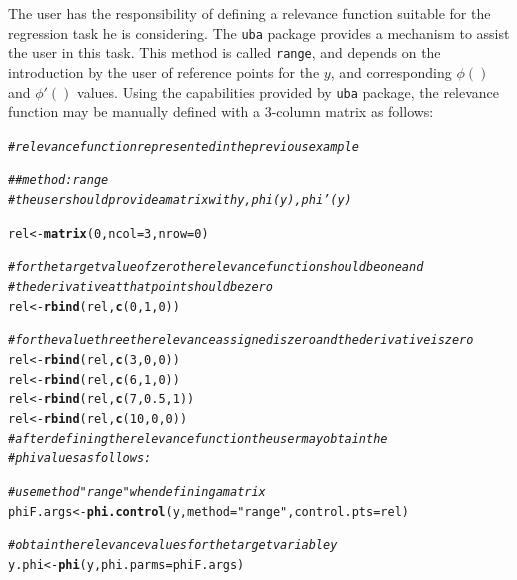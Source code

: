 \documentclass[10pt,a4paper]{article}\usepackage[]{graphicx}\usepackage[]{color}
\makeatletter
\newcommand{\hlnum}[1]{\textcolor[rgb]{0.686,0.059,0.569}{#1}}%
\newcommand{\hlstr}[1]{\textcolor[rgb]{0.192,0.494,0.8}{#1}}%
\newcommand{\hlcom}[1]{\textcolor[rgb]{0.678,0.584,0.686}{\textit{#1}}}%
\newcommand{\hlstd}[1]{\textcolor[rgb]{0.345,0.345,0.345}{#1}}%
\newcommand{\hlkwb}[1]{\textcolor[rgb]{0.69,0.353,0.396}{#1}}%
\newcommand{\hlkwc}[1]{\textcolor[rgb]{0.333,0.667,0.333}{#1}}%
\newcommand{\hlkwd}[1]{\textcolor[rgb]{0.737,0.353,0.396}{\textbf{#1}}}%
\newenvironment{kframe}{%
 \def\at@end@of@kframe{}%
 \ifinner\ifhmode%
  \def\at@end@of@kframe{\end{minipage}}%
  \begin{minipage}{\columnwidth}%
 \fi\fi%
 \def\FrameCommand##1{\hskip\@totalleftmargin \hskip-\fboxsep
 \colorbox{shadecolor}{##1}\hskip-\fboxsep
     \hskip-\linewidth \hskip-\@totalleftmargin \hskip\columnwidth}%
 \MakeFramed {\advance\hsize-\width
   \@totalleftmargin\z@ \linewidth\hsize
   \@setminipage}}%
 {\par\unskip\endMakeFramed%
 \at@end@of@kframe}
\newenvironment{knitrout}{}{} %
\makeatother
\begin{document}
The user has the responsibility of defining a relevance function suitable for the regression task he is considering. The \texttt{uba} package provides a mechanism to assist the user in this task. This method is called \texttt{range}, and depends on the introduction by the user of reference points for the $y$, and corresponding $\phi()$ and $\phi'()$ values. Using the capabilities provided by \texttt{uba} package, the relevance function may be manually defined with a 3-column matrix as follows:

\begin{knitrout}\footnotesize
{}\color{fgcolor}\begin{kframe}
\begin{alltt}
\hlcom{# relevance function represented in the previous example}

\hlcom{## method: range}
\hlcom{# the user should provide a matrix with y, phi(y), phi'(y)}

\hlstd{rel} \hlkwb{<-} \hlkwd{matrix}\hlstd{(}\hlnum{0}\hlstd{,}\hlkwc{ncol}\hlstd{=}\hlnum{3}\hlstd{,}\hlkwc{nrow}\hlstd{=}\hlnum{0}\hlstd{)}

\hlcom{# for the target value of zero the relevance function should be one and}
\hlcom{# the derivative at that point should be zero}
\hlstd{rel} \hlkwb{<-} \hlkwd{rbind}\hlstd{(rel,}\hlkwd{c}\hlstd{(}\hlnum{0}\hlstd{,}\hlnum{1}\hlstd{,}\hlnum{0}\hlstd{))}

\hlcom{# for the value three the relevance assigned is zero and the derivative is zero}
\hlstd{rel} \hlkwb{<-} \hlkwd{rbind}\hlstd{(rel,}\hlkwd{c}\hlstd{(}\hlnum{3}\hlstd{,}\hlnum{0}\hlstd{,}\hlnum{0}\hlstd{))}
\hlstd{rel} \hlkwb{<-} \hlkwd{rbind}\hlstd{(rel,}\hlkwd{c}\hlstd{(}\hlnum{6}\hlstd{,}\hlnum{1}\hlstd{,}\hlnum{0}\hlstd{))}
\hlstd{rel} \hlkwb{<-} \hlkwd{rbind}\hlstd{(rel,}\hlkwd{c}\hlstd{(}\hlnum{7}\hlstd{,}\hlnum{0.5}\hlstd{,}\hlnum{1}\hlstd{))}
\hlstd{rel} \hlkwb{<-} \hlkwd{rbind}\hlstd{(rel,}\hlkwd{c}\hlstd{(}\hlnum{10}\hlstd{,}\hlnum{0}\hlstd{,}\hlnum{0}\hlstd{))}
\hlcom{# after defining the relevance function the user may obtain the }
\hlcom{# phi values as follows:}

\hlcom{# use method "range" when defining a matrix}
\hlstd{phiF.args} \hlkwb{<-} \hlkwd{phi.control}\hlstd{(y,}\hlkwc{method}\hlstd{=}\hlstr{"range"}\hlstd{,}\hlkwc{control.pts}\hlstd{=rel)}

\hlcom{# obtain the relevance values for the target variable y}
\hlstd{y.phi} \hlkwb{<-} \hlkwd{phi}\hlstd{(y,}\hlkwc{phi.parms}\hlstd{=phiF.args)}
\end{alltt}
\end{kframe}
\end{knitrout}
\end{document}
